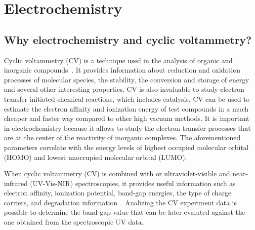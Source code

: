 \documentclass[../Master.tex]{subfiles}
\begin{document}
\newpage\section{Electrochemistry}\label{sec:electrochemistry}

\subsection{Why electrochemistry and cyclic voltammetry?}\label{sec:elect-intro}

Cyclic voltammetry (CV) is a technique used in the analysis of organic and inorganic compounds\ \cite{elgrishi_practical_2018}. It provides information about reduction and oxidation processes of molecular species, the stability, the conversion and storage of energy and several other interesting properties. CV is also invaluable to study electron transfer-initiated chemical reactions, which includes catalysis. CV can be used to estimate the electron affinity and ionization energy of test compounds in a much cheaper and faster way compared to other high vacuum methods. It is important in electrochemistry because it allows to study the electron transfer processes that are at the center of the reactivity of inorganic complexes.
The aforementioned parameters correlate with the energy levels of highest occupied molecular orbital (HOMO) and lowest unoccupied molecular orbital (LUMO).

When cyclic voltammetry (CV) is combined with or ultraviolet-visible and near-infrared (UV-Vis-NIR) spectroscopies, it provides useful information such as electron affinity, ionization potential, band-gap energies, the type of charge carriers, and degradation information\ \cite{pluczyk_using_2018}. Analizing the CV experiment data is possible to determine the band-gap value that can be later evaluted against the one obtained from the spectroscopic UV data.
\end{document}
